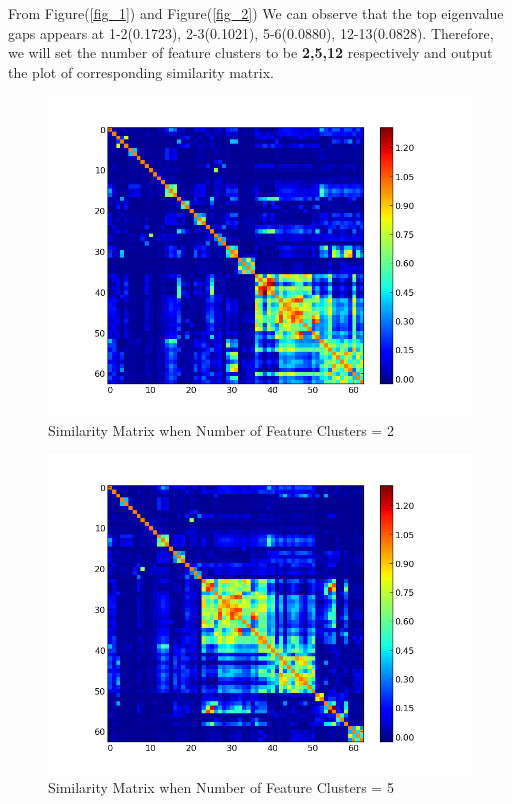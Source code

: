 \documentclass{article}
\begin{document}
From Figure(\ref{fig_1}) and Figure(\ref{fig_2}) We can observe that the top eigenvalue gaps appears at 1-2(0.1723), 2-3(0.1021), 5-6(0.0880), 12-13(0.0828). Therefore, we will set the number of feature clusters to be \textbf{2,5,12} respectively and output the plot of corresponding similarity matrix.
\begin{figure}
\centering
	\includegraphics[width=1.\linewidth]{plt_n_clusters_f_2.png}
	\caption{Similarity Matrix when Number of Feature Clusters = 2}
	\label{fig_3}
\end{figure}

\begin{figure}
\centering
	\includegraphics[width=1.\linewidth]{plt_n_clusters_f_5.png}
	\caption{Similarity Matrix when Number of Feature Clusters = 5}
	\label{fig_4}
\end{figure}
\end{document}
